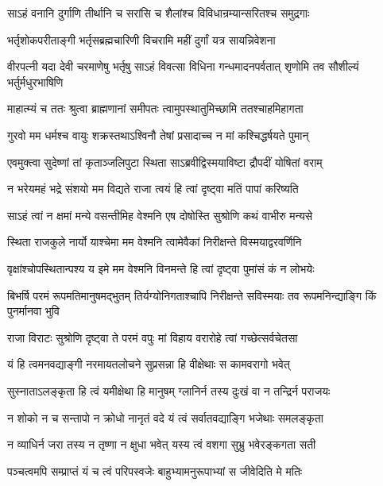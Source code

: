\twolineshloka
{साऽहं वनानि दुर्गाणि तीर्थानि च सरांसि च}
{शैलांश्च विविधान्रम्यान्सरितश्च समुद्रगाः}


\twolineshloka
{भर्तृशोकपरीताङ्गी भर्तृसब्रह्मचारिणी}
{विचरामि महीं दुर्गां यत्र सायन्निवेशना}


\threelineshloka
{वीरपत्नी यदा देवी चरमाणेषु भर्तृषु}
{साऽहं विवत्सा विधिना गन्धमादनपर्वतात्}
{शृणोमि तव सौशील्यं भर्तुर्मधुरभाषिणि}


\twolineshloka
{माहात्म्यं च ततः श्रुत्वा ब्राह्मणानां समीपतः}
{त्वामुपस्थातुमिच्छामि ततश्चाहमिहागता}


\twolineshloka
{गुरवो मम धर्मश्च वायुः शक्रस्तथाऽश्विनौ}
{तेषां प्रसादाच्च न मां कश्चिद्धर्षयते पुमान्}



\twolineshloka
{एवमुक्त्वा सुदेष्णां तां कृताञ्जलिपुटा स्थिता}
{साऽब्रवीद्विस्मयाविष्टा द्रौपदीं योषितां वराम्}


\twolineshloka
{न भरेयमहं भद्रे संशयो मम विद्यते}
{राजा त्वयं हि त्वां दृष्ट्वा मतिं पापां करिष्यति}


\twolineshloka
{साऽहं त्वां न क्षमां मन्ये वसन्तीमिह वेश्मनि}
{एष दोषोस्ति सुश्रोणि कथं वाभीरु मन्यसे}


\twolineshloka
{स्थिता राजकुले नार्यो याश्चेमा मम वेश्मनि}
{त्वामेवैकां निरीक्षन्ते विस्मयाद्वरवर्णिनि}


\twolineshloka
{वृक्षांश्चोपस्थितान्पश्य य इमे मम वेश्मनि}
{विनमन्ते हि त्वां दृष्ट्वा पुमांसं कं न लोभयेः}


\threelineshloka
{बिभर्षि परमं रूपमतिमानुषमद्भुतम्}
{तिर्यग्योनिगताश्चापि निरीक्षन्ते सविस्मयाः}
{तव रूपमनिन्द्याङ्गि किं पुनर्मानवा भुवि}


\twolineshloka
{राजा विराटः सुश्रोणि दृष्ट्वा ते परमं वपुः}
{मां विहाय वरारोहे त्वां गच्छेत्सर्वचेतसा}


\twolineshloka
{यं हि त्वमनवद्याङ्गी नरमायतलोचने}
{सुप्रसन्ना हि वीक्षेथाः स कामवरागो भवेत्}


\twolineshloka
{सुस्नाताऽलङ्कृता हि त्वं यमीक्षेथा हि मानुषम्}
{ग्लानिर्न तस्य दुःखं वा न तन्द्रिर्न पराजयः}


\twolineshloka
{न शोको न च सन्तापो न क्रोधो नानृतं वदे}
{यं त्वं सर्वातवद्याङ्गि भजेथाः समलङ्कृता}


\twolineshloka
{न व्याधिर्न जरा तस्य न तृष्णा न क्षुधा भवेत्}
{यस्य त्वं वशगा सुभ्रु भवेरङ्कगता सती}





\twolineshloka
{पञ्चत्वमपि सम्प्राप्तं यं च त्वं परिपस्वजेः}
{बाहुभ्यामनुरूपाभ्यां स जीवेदिति मे मतिः}


